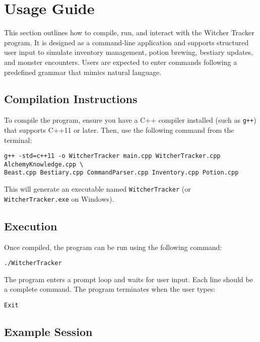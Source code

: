 \documentclass{article}
\begin{document}
\section{Usage Guide}

This section outlines how to compile, run, and interact with the Witcher Tracker program. It is designed as a command-line application and supports structured user input to simulate inventory management, potion brewing, bestiary updates, and monster encounters. Users are expected to enter commands following a predefined grammar that mimics natural language.

\subsection*{Compilation Instructions}

To compile the program, ensure you have a C++ compiler installed (such as \texttt{g++}) that supports C++11 or later. Then, use the following command from the terminal:

\begin{verbatim}
g++ -std=c++11 -o WitcherTracker main.cpp WitcherTracker.cpp AlchemyKnowledge.cpp \
Beast.cpp Bestiary.cpp CommandParser.cpp Inventory.cpp Potion.cpp
\end{verbatim}

This will generate an executable named \texttt{WitcherTracker} (or \texttt{WitcherTracker.exe} on Windows).

\subsection*{Execution}

Once compiled, the program can be run using the following command:

\begin{verbatim}
./WitcherTracker
\end{verbatim}

The program enters a prompt loop and waits for user input. Each line should be a complete command. The program terminates when the user types:

\begin{lstlisting}
Exit
\end{lstlisting}

\subsection*{Example Session}
\end{document}
